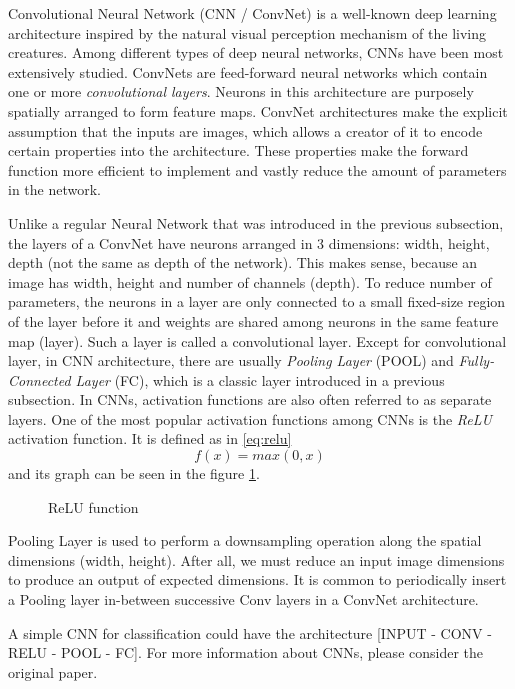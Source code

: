 Convolutional Neural Network (CNN / ConvNet) is a well-known deep learning architecture inspired by the natural visual perception mechanism of the living creatures. Among different types of deep neural networks, CNNs have been most extensively studied. ConvNets are feed-forward neural networks which contain one or more \textit{convolutional layers}. Neurons in this architecture are purposely spatially arranged to form feature maps. ConvNet architectures make the explicit assumption that the inputs are images, which allows a creator of it to encode certain properties into the architecture. These properties make the forward function more efficient to implement and vastly reduce the amount of parameters in the network.

Unlike a regular Neural Network that was introduced in the previous subsection, the layers of a ConvNet have neurons arranged in 3 dimensions: width, height, depth (not the same as depth of the network). This makes sense, because an image has width, height and number of channels (depth). To reduce number of parameters, the neurons in a layer are only connected to a small fixed-size region of the layer before it and weights are shared among neurons in the same feature map (layer). Such a layer is called a convolutional layer. Except for convolutional layer, in CNN architecture, there are usually \textit{Pooling Layer} (POOL) and \textit{Fully-Connected Layer} (FC), which is a classic layer introduced in a previous subsection. In CNNs, activation functions are also often referred to as separate layers. One of the most popular activation functions among CNNs is the \textit{ReLU} activation function. It is defined as in  \ref{eq:relu}
\begin{equation}\label{eq:relu}
f(x) = max (0, x)
\end{equation}
and its graph can be seen in the figure \ref{fig:relu}.

\begin{figure}[!ht]
\centering
{}
\caption{ReLU function}
\label{fig:relu}
\end{figure}

Pooling Layer is used to perform a downsampling operation along the spatial dimensions (width, height). After all, we must reduce an input image dimensions to produce an output of expected dimensions.  It is common to periodically insert a Pooling layer in-between successive Conv layers in a ConvNet architecture.

A simple CNN for classification could have the architecture [INPUT - CONV - RELU - POOL - FC]. For more information about CNNs, please consider the original paper\cite{krizhevsky2012imagenet}. 
